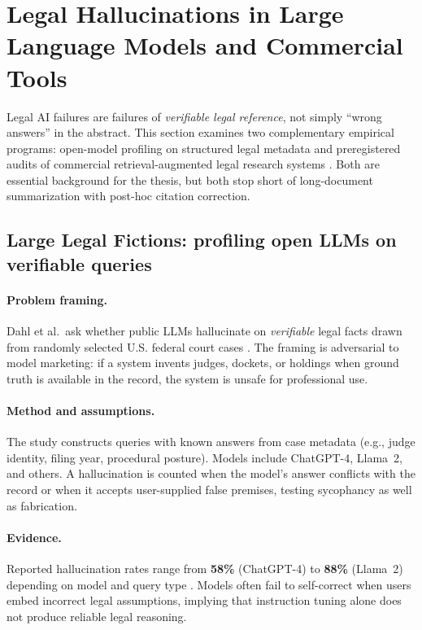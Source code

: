 \section{Legal Hallucinations in Large Language Models and Commercial Tools}
\label{sec:lit-legal-hallucinations}

Legal AI failures are failures of \emph{verifiable legal reference}, not simply ``wrong answers'' in the abstract. This section examines two complementary empirical programs: open-model profiling on structured legal metadata \cite{dahl2024largelegalfictions} and preregistered audits of commercial retrieval-augmented legal research systems \cite{magesh2025hallucinationfree}. Both are essential background for the thesis, but both stop short of long-document summarization with post-hoc citation correction.

\subsection{Large Legal Fictions: profiling open LLMs on verifiable queries}
\label{sec:lit-dahl}

\paragraph{Problem framing.}
Dahl et al.\ ask whether public LLMs hallucinate on \emph{verifiable} legal facts drawn from randomly selected U.S. federal court cases \cite{dahl2024largelegalfictions}. The framing is adversarial to model marketing: if a system invents judges, dockets, or holdings when ground truth is available in the record, the system is unsafe for professional use.

\paragraph{Method and assumptions.}
The study constructs queries with known answers from case metadata (e.g., judge identity, filing year, procedural posture). Models include ChatGPT-4, Llama~2, and others. A hallucination is counted when the model's answer conflicts with the record or when it accepts user-supplied false premises, testing sycophancy as well as fabrication.

\paragraph{Evidence.}
Reported hallucination rates range from \textbf{58\%} (ChatGPT-4) to \textbf{88\%} (Llama~2) depending on model and query type \cite{dahl2024largelegalfictions}. Models often fail to self-correct when users embed incorrect legal assumptions, implying that instruction tuning alone does not produce reliable legal reasoning.

